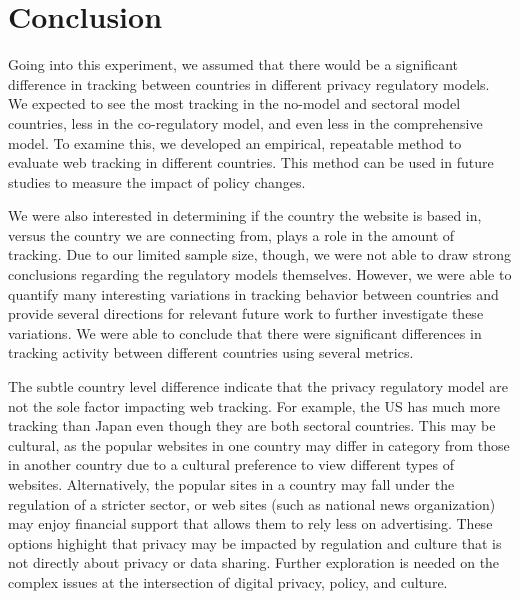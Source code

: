 \documentclass[conference]{IEEEtran}
\begin{document}
\section{Conclusion}
Going into this experiment, we assumed that there would be a significant difference in tracking between countries in different privacy regulatory models. We expected to see the most tracking in the no-model and sectoral model countries, less in the co-regulatory model, and even less in the comprehensive model. To examine this, we developed an empirical, repeatable method to evaluate web tracking in different countries.  This method can be used in future studies to measure the impact of policy changes.

We were also interested in determining if the country the website is based in, versus the country we are connecting from, plays a role in the amount of tracking. Due to our limited sample size, though, we were not able to draw strong conclusions regarding the regulatory models themselves. However, we were able to quantify many interesting variations in tracking behavior between countries and provide several directions for relevant future work to further investigate these variations.  We were able to conclude that there were significant differences in tracking activity between different countries using several metrics. 

The subtle country level difference indicate that the privacy regulatory model are not the sole factor impacting web tracking.  For example, the US has much more tracking than Japan even though they are both sectoral countries.  This may be cultural, as the popular websites in one country may differ in category from those in another country due to a cultural preference to view different types of websites. Alternatively, the popular sites in a country may fall under the regulation of a stricter sector, or web sites (such as national news organization) may enjoy financial support that allows them to rely less on advertising. These options highight that privacy may be impacted by regulation and culture that is not directly about privacy or data sharing. Further exploration is needed on the complex issues at the intersection of digital privacy, policy, and culture. 



\ifCLASSOPTIONcaptionsoff
  \newpage
\fi
\end{document}
